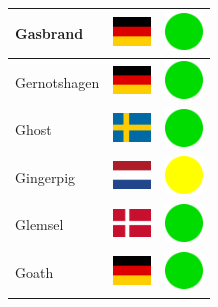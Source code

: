 \documentclass[12pt, a4paper, twoside]{report}
\begin{document}
\begin{center}
\begin{longtable}{|p{5cm}|p{2cm}|p{2cm}|}
 Gasbrand                                                   & \includegraphics[width=1cm]{../4x3/de} &   \includegraphics[width=1cm]{../likes/y} \\ \hline
 Gernotshagen                                               & \includegraphics[width=1cm]{../4x3/de} &   \includegraphics[width=1cm]{../likes/y} \\ \hline
 Ghost                                                      & \includegraphics[width=1cm]{../4x3/se} &   \includegraphics[width=1cm]{../likes/y} \\ \hline
 Gingerpig                                                  & \includegraphics[width=1cm]{../4x3/nl} &   \includegraphics[width=1cm]{../likes/m} \\ \hline
 Glemsel                                                    & \includegraphics[width=1cm]{../4x3/dk} &   \includegraphics[width=1cm]{../likes/y} \\ \hline
 Goath                                                      & \includegraphics[width=1cm]{../4x3/de} &   \includegraphics[width=1cm]{../likes/y} \\ \hline

\end{longtable}
\end{center}
\end{document}
